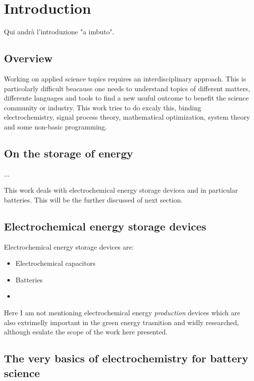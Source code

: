\chapter{Introduction}

Qui andrà l'introduzione "a imbuto".

\section{Overview}
Working on applied science topics requires an interdisciplinary approach. This is particolarly difficult beacause one needs to understand topics of different matters, differente languages and tools to find a new usuful outcome to benefit the science community or industry. This work tries to do excaly this, binding electrochemistry, signal process theory, mathematical optimization, system theory and some non-basic programming. 

\section{On the storage of energy}

...

This work deals with electrochemical energy storage devicea and in particular batteries. This will be the further discussed of next section.

\section{Electrochemical energy storage devices}
Electrochemical energy storage devices are:
\begin{itemize}
    \item Electrochemical capacitors
    \item Batteries
    \item 
\end{itemize}

Here I am not mentioning electrochemical energy \emph{production} devices which are also extrimelly important in the green energy trasnition and widly researched, although esulate the scope of the work here presented.

\section{The very basics of electrochemistry for battery science}

